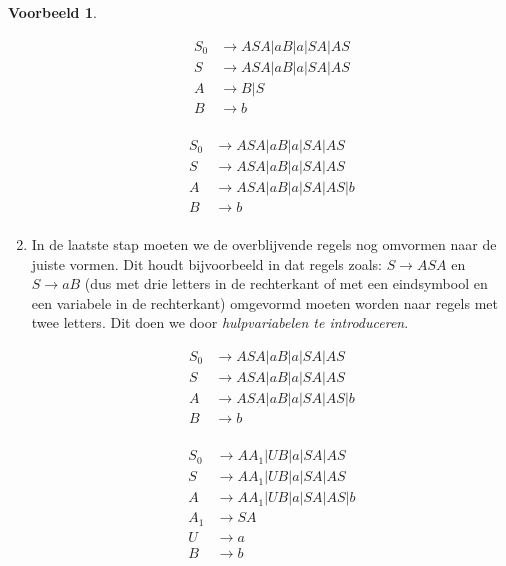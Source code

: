 \documentclass[12pt,a4paper]{article}
\theoremstyle{definition}
\newtheorem{vb}{Voorbeeld}[section]
\newcommand{\ra}{\ensuremath{\rightarrow}}
\begin{document}
\begin{vb}
\begin{enumerate}
			\begin{minipage}{.4\textwidth}
				\begin{align*}
				S_0&\ra ASA|aB|a|SA|AS\\
				S&\ra ASA|aB|a|SA|AS\\
				A&\ra B|S\\
				B&\ra b\\
				\end{align*}
			\end{minipage}
			\begin{minipage}{.3\textwidth}
				\begin{align*}
				S_0&\ra ASA|aB|a|SA|AS\\
				S&\ra ASA|aB|a|SA|AS\\
				A&\ra ASA|aB|a|SA|AS|b\\
				B&\ra b\\
				\end{align*}
			\end{minipage}
			\item In de laatste stap moeten we de overblijvende regels nog omvormen naar de juiste vormen. Dit houdt bijvoorbeeld in dat regels zoals: $S \ra ASA$ en $S\ra aB$ (dus met drie letters in de rechterkant of met een eindsymbool en een variabele in de rechterkant) omgevormd moeten worden naar regels met twee letters. Dit doen we door \textit{hulpvariabelen te introduceren}.\\
			\begin{minipage}{.3\textwidth}
				\begin{align*}
				S_0&\ra ASA|aB|a|SA|AS\\
				S&\ra ASA|aB|a|SA|AS\\
				A&\ra ASA|aB|a|SA|AS|b\\
				B&\ra b\\
				\end{align*}
			\end{minipage}
			\begin{minipage}{.5\textwidth}
				\begin{align*}
				S_0&\ra AA_1|UB|a|SA|AS\\
				S&\ra AA_1|UB|a|SA|AS\\
				A&\ra AA_1|UB|a|SA|AS|b\\
				A_1 &\ra SA\\
				U&\ra a\\
				B&\ra b\\
				\end{align*}
			\end{minipage}
		\end{enumerate}
	\end{vb}
\end{document}
